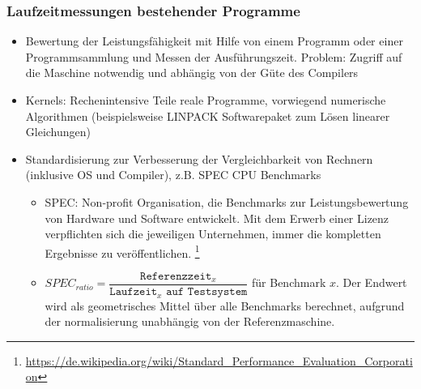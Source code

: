 \subsubsection{Laufzeitmessungen bestehender Programme}
\begin{itemize}
	\item Bewertung der Leistungsfähigkeit mit Hilfe von einem Programm oder einer Programmsammlung und Messen der Ausführungszeit. Problem: Zugriff auf die Maschine notwendig und abhängig von der Güte des Compilers
	\item Kernels: Rechenintensive Teile reale Programme, vorwiegend numerische Algorithmen (beispielsweise LINPACK Softwarepaket zum Lösen linearer Gleichungen)
	\item Standardisierung zur Verbesserung der Vergleichbarkeit von Rechnern (inklusive OS und Compiler), z.B. SPEC CPU Benchmarks
	\begin{itemize}
		\item SPEC: Non-profit Organisation, die Benchmarks zur Leistungsbewertung von Hardware und Software entwickelt. Mit dem Erwerb einer Lizenz verpflichten sich die jeweiligen Unternehmen, immer die kompletten Ergebnisse zu veröffentlichen. \footnote{\url{https://de.wikipedia.org/wiki/Standard_Performance_Evaluation_Corporation}}
		\item $SPEC_{ratio} = \dfrac{\texttt{Referenzzeit}_x}{\texttt{Laufzeit}_x\texttt{ auf Testsystem}}$ für Benchmark $x$. Der Endwert wird als geometrisches Mittel über alle Benchmarks berechnet, aufgrund der normalisierung unabhängig von der Referenzmaschine.
	\end{itemize}
\end{itemize}

